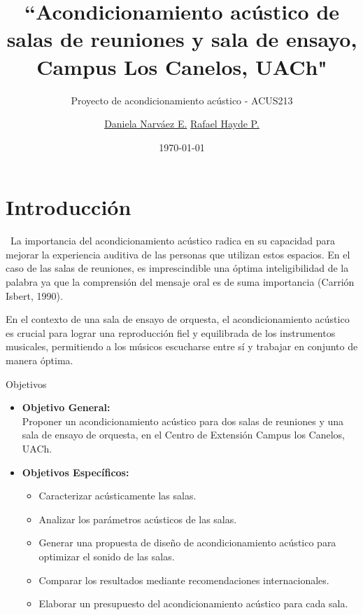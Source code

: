 \documentclass{sintefbeamer}
\title{``Acondicionamiento acústico de salas de reuniones y sala de ensayo, Campus Los Canelos, UACh" }
\subtitle{Proyecto de acondicionamiento acústico - ACUS213}
\author{\href{daniela.narvaez01@alumnos.uach.cl}{Daniela Narváez E.} \newline \href{rafael.penailillo@alumnos.uach.cl}{Rafael Hayde P.}}
\date{\today}
\begin{document}
\maketitle

\section{Introducción}
\begin{frame}{\thesection \, \secname}
La importancia del acondicionamiento acústico radica en su capacidad para mejorar la experiencia auditiva de las personas que utilizan estos espacios. En el caso de las salas de reuniones, es imprescindible una óptima inteligibilidad de la palabra ya que la comprensión del mensaje oral es de suma importancia (Carrión Isbert, 1990). 

En el contexto de una sala de ensayo de orquesta, el acondicionamiento acústico es crucial para lograr una reproducción fiel y equilibrada de los instrumentos musicales, permitiendo a los músicos escucharse entre sí y trabajar en conjunto de manera óptima.
\end{frame}

\begin{frame}{Objetivos}
\begin{itemize}
    \item \textbf{Objetivo General:} \\
    Proponer un acondicionamiento acústico para dos salas de reuniones y una sala de ensayo de orquesta, en el Centro de Extensión Campus los Canelos, UACh.

    \item \textbf{Objetivos Específicos:}
    \begin{itemize}
        \item Caracterizar acústicamente las salas.
        \item Analizar los parámetros acústicos de las salas.
        \item Generar una propuesta de diseño de acondicionamiento acústico para optimizar el sonido de las salas.
        \item Comparar los resultados mediante recomendaciones internacionales. 
        \item Elaborar un presupuesto del acondicionamiento acústico para cada sala.

    \end{itemize}
\end{itemize}
\end{frame}
\end{document}
